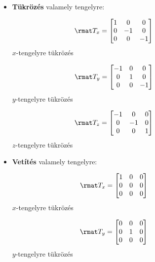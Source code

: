 \documentclass[a4paper, 12pt]{scrartcl}
\begin{document}
\clearpage
\begin{blueBox}

  \begin{itemize}
    \item \textbf{Tükrözés} valamely tengelyre:
          \vspace{-10mm}
          \begin{multicols}{3}
            $$
              \rmat T_x = \begin{bmatrix}
                1 & 0  & 0  \\
                0 & -1 & 0  \\
                0 & 0  & -1
              \end{bmatrix}
              \phantom{= \rmat T_x}
            $$
            $x$-tengelyre tükrözés

            $$
              \rmat T_y = \begin{bmatrix}
                -1 & 0 & 0  \\
                0  & 1 & 0  \\
                0  & 0 & -1
              \end{bmatrix}
              \phantom{= \rmat T_y}
            $$
            $y$-tengelyre tükrözés

            $$
              \rmat T_z = \begin{bmatrix}
                -1 & 0  & 0 \\
                0  & -1 & 0 \\
                0  & 0  & 1
              \end{bmatrix}
              \phantom{= \rmat T_z}
            $$
            $z$-tengelyre tükrözés
          \end{multicols}

    \item \textbf{Vetítés} valamely tengelyre:
          \vspace{-10mm}
          \begin{multicols}{3}
            $$
              \rmat T_x = \begin{bmatrix}
                1 & 0 & 0 \\
                0 & 0 & 0 \\
                0 & 0 & 0
              \end{bmatrix}
              \phantom{= \rmat T_x}
            $$
            $x$-tengelyre tükrözés

            $$
              \rmat T_y = \begin{bmatrix}
                0 & 0 & 0 \\
                0 & 1 & 0 \\
                0 & 0 & 0
              \end{bmatrix}
              \phantom{= \rmat T_y}
            $$
            $y$-tengelyre tükrözés


\end{multicols}
\end{itemize}
\end{blueBox}
\end{document}

